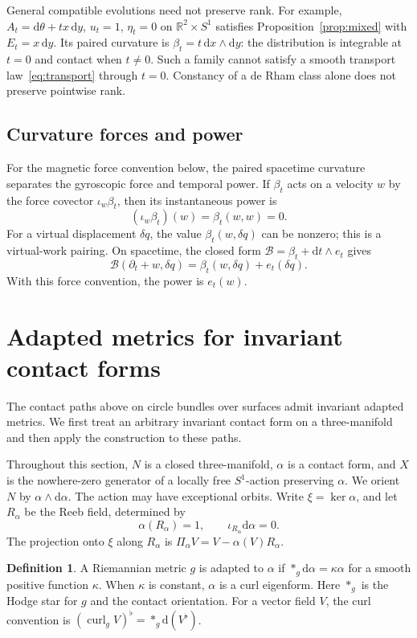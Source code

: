 \documentclass[11pt,a4paper]{article}
\numberwithin{equation}{section}
\theoremstyle{definition}
\newtheorem{definition}[theorem]{Definition}
\theoremstyle{remark}
\newcommand{\R}{\mathbb R}
\newcommand{\dd}{\mathrm d}
\begin{document}
General compatible evolutions need not preserve rank. For example,
$A_t=\dd\theta+t x\,\dd y$, $u_t=1$, $\eta_t=0$ on
$\R^2\times S^1$ satisfies Proposition~\ref{prop:mixed} with
$E_t=x\,\dd y$. Its paired curvature is
$\beta_t=t\,\dd x\wedge\dd y$: the distribution is integrable at $t=0$
and contact when $t\ne0$. Such a family cannot satisfy a smooth transport
law~\eqref{eq:transport} through $t=0$. Constancy of a de Rham class alone
does not preserve pointwise rank.

\subsection{Curvature forces and power}

For the magnetic force convention below, the paired spacetime curvature
separates the gyroscopic force and temporal power. If $\beta_t$ acts on a velocity $w$ by
the force covector $\iota_w\beta_t$, then its instantaneous power is
\[
 (\iota_w\beta_t)(w)=\beta_t(w,w)=0.
\]
For a virtual displacement $\delta q$, the value
$\beta_t(w,\delta q)$ can be nonzero; this is a virtual-work pairing.
On spacetime, the closed form
$\mathcal B=\beta_t+\dd t\wedge e_t$ gives
\[
 \mathcal B(\partial_t+w,\delta q)
 =\beta_t(w,\delta q)+e_t(\delta q).
\]
With this force convention, the power is $e_t(w)$.

\section{Adapted metrics for invariant contact forms}
\label{sec:metrics}

The contact paths above on circle bundles over surfaces admit invariant
adapted metrics. We first treat an arbitrary invariant contact form on a
three-manifold and then apply the construction to these paths.

Throughout this section, $N$ is a closed three-manifold, $\alpha$ is a
contact form, and $X$ is the nowhere-zero generator of a locally free
$S^1$-action preserving $\alpha$. We orient $N$ by
$\alpha\wedge\dd\alpha$. The action may have exceptional orbits.
Write $\xi=\ker\alpha$, and let $R_\alpha$ be the Reeb field, determined by
\[
 \alpha(R_\alpha)=1,\qquad \iota_{R_\alpha}\dd\alpha=0.
\]
The projection onto $\xi$ along $R_\alpha$ is
$\Pi_\alpha V=V-\alpha(V)R_\alpha$.

\begin{definition}
A Riemannian metric $g$ is adapted to $\alpha$ if
$*_g\dd\alpha=\kappa\alpha$ for a smooth positive function $\kappa$.
When $\kappa$ is constant, $\alpha$ is a curl eigenform.
Here $*_g$ is the Hodge star for $g$ and the contact orientation.
For a vector field $V$, the curl convention is
$(\operatorname{curl}_g V)^\flat=*_g\dd(V^\flat)$.
\end{definition}
\end{document}

